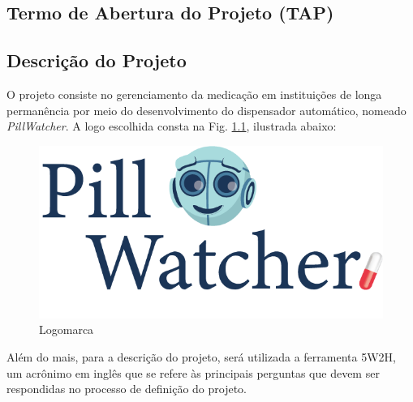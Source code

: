 \begin{apendicesenv}
\partapendices
\chapter{Termo de Abertura do Projeto (TAP)}
\label{ATP_app}
\section{Descrição do Projeto}

O projeto consiste no gerenciamento da medicação em instituições de longa permanência por meio do  desenvolvimento do dispensador automático, nomeado \textit{PillWatcher}. A logo escolhida consta na Fig. \ref{fig:logo}, ilustrada abaixo:


\begin{figure}[H]
    \centering
    \includegraphics[scale=2]{figuras/gerenciamento/pillwatcher_logo.png}
    \caption{Logomarca}
    \label{fig:logo}
\end{figure}

Além do mais, para a descrição do projeto, será utilizada a ferramenta 5W2H, um acrônimo em inglês que se refere às principais perguntas que devem ser respondidas no processo de definição do projeto. 


\end{apendicesenv}
